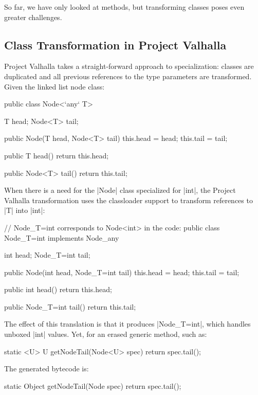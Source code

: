 So far, we have only looked at methods, but transforming classes poses even greater challenges.

\subsection{Class Transformation in Project Valhalla}

Project Valhalla takes a straight-forward approach to specialization: classes are duplicated and all previous references to the type parameters are transformed. Given the linked list node class:

\begin{lstlisting-nobreak}
 public class Node<`any` T> {
   T head;
   Node<T> tail;

   public Node(T head, Node<T> tail) {
     this.head = head;
     this.tail = tail;
   }

   public T head() {
     return this.head;
   }

   public Node<T> tail() {
     return this.tail;
   }
 }
\end{lstlisting-nobreak}

When there is a need for the |Node| class specialized for |int|, the Project Valhalla transformation uses the classloader support to transform references to |T| into |int|:

\begin{lstlisting-nobreak}
 // Node_{T=int} corresponds to Node<int> in the code:
 public class Node_{T=int} implements Node_any {
   int head;
   Node_{T=int} tail;

   public Node(int head, Node_{T=int} tail) {
     this.head = head;
     this.tail = tail;
   }

   public int head() {
     return this.head;
   }

   public Node_{T=int} tail() {
     return this.tail;
   }
 }
\end{lstlisting-nobreak}

The effect of this translation is that it produces |Node_{T=int}|, which handles unboxed |int| values. Yet, for an erased generic method, such as:

\begin{lstlisting-nobreak}
static <U> U getNodeTail(Node<U> spec) {
  return spec.tail();
}
\end{lstlisting-nobreak}

The generated bytecode is:

\begin{lstlisting-nobreak}
static Object getNodeTail(Node spec) {
  return spec.tail();
}
\end{lstlisting-nobreak}

